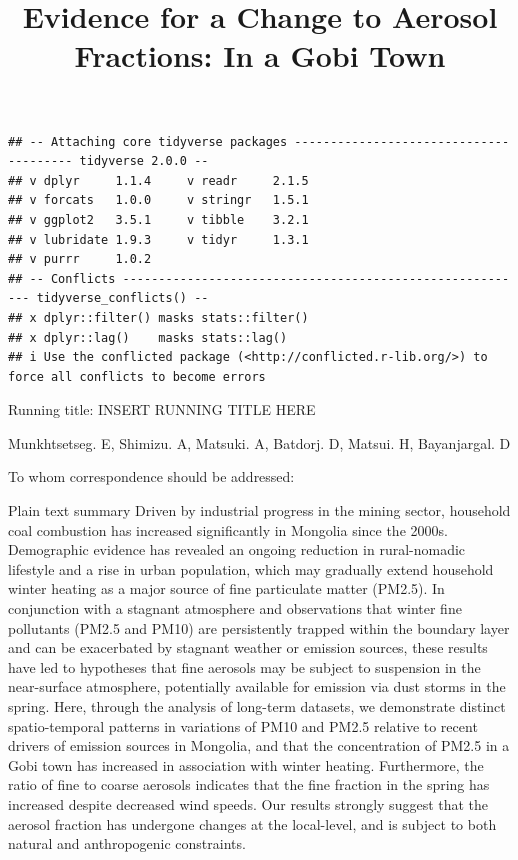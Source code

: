 \documentclass[
  11pt,
]{article}
\title{\textbf{Evidence for a Change to Aerosol Fractions: In a Gobi
Town}}
\author{}
\date{\vspace{-2.5em}}
\begin{document}
\maketitle

\begin{verbatim}
## -- Attaching core tidyverse packages --------------------------------------- tidyverse 2.0.0 --
## v dplyr     1.1.4     v readr     2.1.5
## v forcats   1.0.0     v stringr   1.5.1
## v ggplot2   3.5.1     v tibble    3.2.1
## v lubridate 1.9.3     v tidyr     1.3.1
## v purrr     1.0.2     
## -- Conflicts --------------------------------------------------------- tidyverse_conflicts() --
## x dplyr::filter() masks stats::filter()
## x dplyr::lag()    masks stats::lag()
## i Use the conflicted package (<http://conflicted.r-lib.org/>) to force all conflicts to become errors
\end{verbatim}

\vspace{35mm}

Running title: INSERT RUNNING TITLE HERE

\vspace{35mm}

Munkhtsetseg. E, Shimizu. A, Matsuki. A, Batdorj. D, Matsui. H,
Bayanjargal. D

\vspace{40mm}

To whom correspondence should be addressed:

\newpage
\linenumbers

Plain text summary Driven by industrial progress in the mining sector,
household coal combustion has increased significantly in Mongolia since
the 2000s. Demographic evidence has revealed an ongoing reduction in
rural-nomadic lifestyle and a rise in urban population, which may
gradually extend household winter heating as a major source of fine
particulate matter (PM2.5). In conjunction with a stagnant atmosphere
and observations that winter fine pollutants (PM2.5 and PM10) are
persistently trapped within the boundary layer and can be exacerbated by
stagnant weather or emission sources, these results have led to
hypotheses that fine aerosols may be subject to suspension in the
near-surface atmosphere, potentially available for emission via dust
storms in the spring. Here, through the analysis of long-term datasets,
we demonstrate distinct spatio-temporal patterns in variations of PM10
and PM2.5 relative to recent drivers of emission sources in Mongolia,
and that the concentration of PM2.5 in a Gobi town has increased in
association with winter heating. Furthermore, the ratio of fine to
coarse aerosols indicates that the fine fraction in the spring has
increased despite decreased wind speeds. Our results strongly suggest
that the aerosol fraction has undergone changes at the local-level, and
is subject to both natural and anthropogenic constraints.
\end{document}
